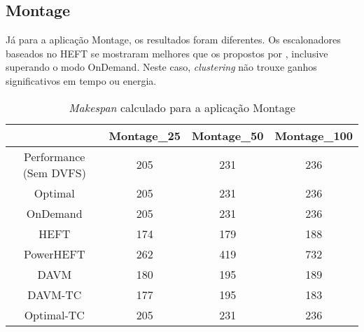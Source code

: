 \subsection{Montage} %
\label{sub:montage}

Já para a aplicação Montage, os resultados foram diferentes. Os escalonadores
baseados no HEFT se mostraram melhores que os propostos por
\cite{guerout:energy_aware_simulation}, inclusive superando o modo OnDemand.
Neste caso, \emph{clustering} não trouxe ganhos significativos em tempo ou
energia.

\begin{table}
	\centering
    \begin{tabular}{c|ccc}
    ~                    & Montage\_25 & Montage\_50 & Montage\_100 \\ \hline
    Performance (Sem DVFS) & 205        & 231        & 236         \\
    \cite{guerout:energy_aware_simulation} Optimal      & 205        & 231        & 236         \\
    \cite{guerout:energy_aware_simulation} OnDemand     & 205        & 231        & 236         \\
    HEFT                   & 174        & 179        & 188         \\
    PowerHEFT              & 262        & 419        & 732         \\
    DAVM                   & 180        & 195        & 189         \\
    DAVM-TC                & 177        & 195        & 183         \\
    Optimal-TC             & 205        & 231        & 236         \\
    \end{tabular}
    \caption{\emph{Makespan} calculado para a aplicação Montage}
    \label{tab:montage_tempo}
\end{table}



